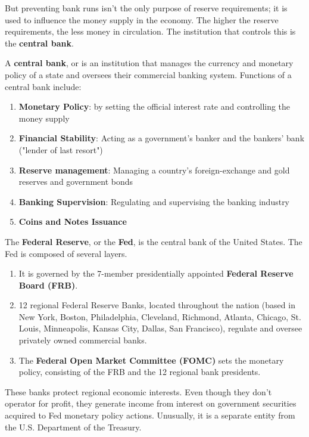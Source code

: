 \documentclass{article}
\begin{document}
    But preventing bank runs isn't the only purpose of reserve requirements; it is used to influence the money supply in the economy. The higher the reserve requirements, the less money in circulation. The institution that controls this is the \textbf{central bank}. 

    \begin{definition}
      \label{def:central-bank}
      A \textbf{central bank}, or  is an institution that manages the currency and monetary policy of a state and oversees their commercial banking system. Functions of a central bank include: 
      \begin{enumerate}
        \item \textbf{Monetary Policy}: by setting the official interest rate and controlling the money supply 
        \item \textbf{Financial Stability}: Acting as a government's banker and the bankers' bank ("lender of last resort") 
        \item \textbf{Reserve management}: Managing a country's foreign-exchange and gold reserves and government bonds
        \item \textbf{Banking Supervision}: Regulating and supervising the banking industry
        \item \textbf{Coins and Notes Issuance}
      \end{enumerate}
    \end{definition}

    \begin{definition}
      \label{def:federal-reserve-structure}
      The \textbf{Federal Reserve}, or the \textbf{Fed}, is the central bank of the United States. The Fed is composed of several layers. 
      \begin{enumerate}
        \item It is governed by the 7-member presidentially appointed \textbf{Federal Reserve Board (FRB)}. 
        \item 12 regional Federal Reserve Banks, located throughout the nation (based in New York, Boston, Philadelphia, Cleveland, Richmond, Atlanta, Chicago, St. Louis, Minneapolis, Kansas City, Dallas, San Francisco), regulate and oversee privately owned commercial banks. 
        \item The \textbf{Federal Open Market Committee (FOMC)} sets the monetary policy, consisting of the FRB and the 12 regional bank presidents. 
      \end{enumerate}
      These banks protect regional economic interests. Even though they don't operator for profit, they generate income from interest on government securities acquired to Fed monetary policy actions. Unusually, it is a separate entity from the U.S. Department of the Treasury. 
    \end{definition}
\end{document}

